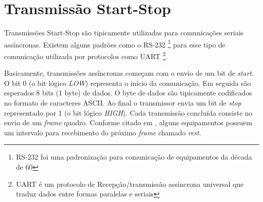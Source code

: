 
\section{Transmissão Start-Stop}

Transmissões Start-Stop são tipicamente utilizadas para comunicações seriais
assíncronas. 
Existem alguns padrões como o RS-232 
\footnote{RS-232 foi uma padronização para comunicação de equipamentos da 
década de 60}
para esse tipo de comunicação utilizada por protocolos como UART
\footnote{UART é um protocolo de Recepção/transmissão assíncrona universal
que traduz dados entre formas paralelas e seriais}.

Basicamente, transmissões assíncronas começam com o envio de um bit de 
\emph{start}. 
O bit 0 (o bit lógico \emph{LOW}) representa o início da 
comunicação. 
Em seguida são esperados 8 bits (1 byte) de dados. 
O byte de dados são tipicamente codificados no formato de caracteres ASCII.
Ao final o transmissor envia um bit de \emph{stop} representado por 
1 (o bit lógico \emph{HIGH}).
Cada transmissão concluída consiste no envio de um \emph{frame} quadro. 
Conforme citado em \citep{asynchronous2009manish}, alguns equipamentos 
possuem um intervalo para recebimento do próximo \emph{frame} chamado 
\emph{rest}.

